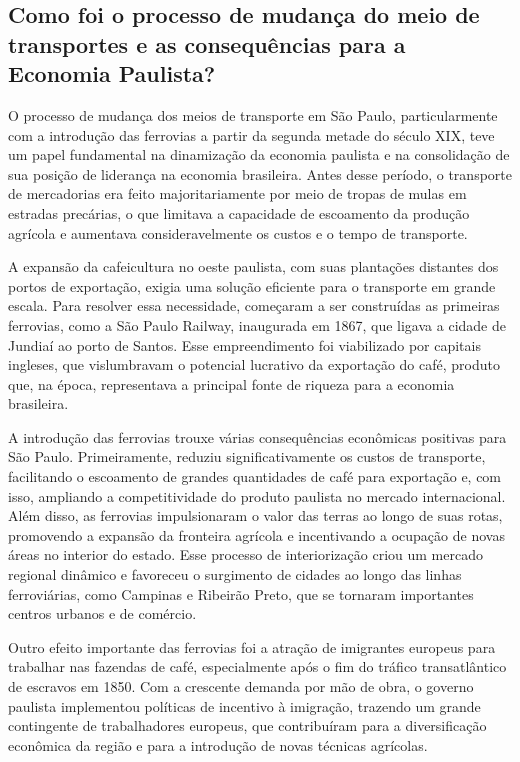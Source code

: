 \documentclass[a4paper,12pt]{article}[abntex2]
\begin{document}
\subsection{\textbf{Como foi o processo de mudança do meio de transportes e as consequências para a Economia Paulista?}}

O processo de mudança dos meios de transporte em São Paulo, particularmente com a introdução das ferrovias a partir da segunda metade do século XIX, teve um papel fundamental na dinamização da economia paulista e na consolidação de sua posição de liderança na economia brasileira. Antes desse período, o transporte de mercadorias era feito majoritariamente por meio de tropas de mulas em estradas precárias, o que limitava a capacidade de escoamento da produção agrícola e aumentava consideravelmente os custos e o tempo de transporte.

A expansão da cafeicultura no oeste paulista, com suas plantações distantes dos portos de exportação, exigia uma solução eficiente para o transporte em grande escala. Para resolver essa necessidade, começaram a ser construídas as primeiras ferrovias, como a São Paulo Railway, inaugurada em 1867, que ligava a cidade de Jundiaí ao porto de Santos. Esse empreendimento foi viabilizado por capitais ingleses, que vislumbravam o potencial lucrativo da exportação do café, produto que, na época, representava a principal fonte de riqueza para a economia brasileira.

A introdução das ferrovias trouxe várias consequências econômicas positivas para São Paulo. Primeiramente, reduziu significativamente os custos de transporte, facilitando o escoamento de grandes quantidades de café para exportação e, com isso, ampliando a competitividade do produto paulista no mercado internacional. Além disso, as ferrovias impulsionaram o valor das terras ao longo de suas rotas, promovendo a expansão da fronteira agrícola e incentivando a ocupação de novas áreas no interior do estado. Esse processo de interiorização criou um mercado regional dinâmico e favoreceu o surgimento de cidades ao longo das linhas ferroviárias, como Campinas e Ribeirão Preto, que se tornaram importantes centros urbanos e de comércio.

Outro efeito importante das ferrovias foi a atração de imigrantes europeus para trabalhar nas fazendas de café, especialmente após o fim do tráfico transatlântico de escravos em 1850. Com a crescente demanda por mão de obra, o governo paulista implementou políticas de incentivo à imigração, trazendo um grande contingente de trabalhadores europeus, que contribuíram para a diversificação econômica da região e para a introdução de novas técnicas agrícolas.
\end{document}
